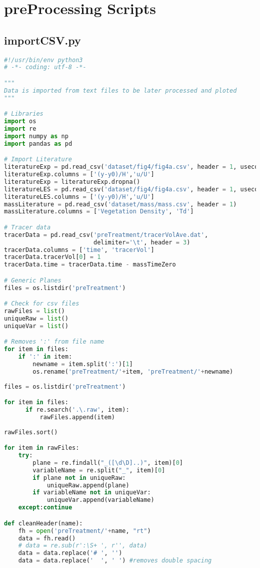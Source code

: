 \documentclass[../main.tex]{subfiles}
\begin{document}
\section{preProcessing Scripts}
\subsection{importCSV.py}
\begin{lstlisting}[language=python]
#!/usr/bin/env python3
# -*- coding: utf-8 -*-

"""
Data is imported from text files to be later processed and ploted
"""

# Libraries
import os
import re
import numpy as np
import pandas as pd

# Import Literature
literatureExp = pd.read_csv('dataset/fig4/fig4a.csv', header = 1, usecols=(0,1))
literatureExp.columns = ['(y-y0)/H','u/U']
literatureExp = literatureExp.dropna()
literatureLES = pd.read_csv('dataset/fig4/fig4a.csv', header = 1, usecols=(2,3))
literatureLES.columns = ['(y-y0)/H','u/U']
massLiterature = pd.read_csv('dataset/mass/mass.csv', header = 1)
massLiterature.columns = ['Vegetation Density', 'Td']

# Tracer data
tracerData = pd.read_csv('preTreatment/tracerVolAve.dat',
                         delimiter='\t', header = 3)
tracerData.columns = ['time', 'tracerVol']
tracerData.tracerVol[0] = 1
tracerData.time = tracerData.time - massTimeZero

# Generic Planes
files = os.listdir('preTreatment')

# Check for csv files
rawFiles = list()
uniqueRaw = list()
uniqueVar = list()

# Removes ':' from file name
for item in files:
    if ':' in item:    
        newname = item.split(':')[1]
        os.rename('preTreatment/'+item, 'preTreatment/'+newname)
        
files = os.listdir('preTreatment')

for item in files:
      if re.search('.\.raw', item):
          rawFiles.append(item)
          
rawFiles.sort()

for item in rawFiles:
    try:
        plane = re.findall("_([\d\D]..)", item)[0]
        variableName = re.split("_", item)[0]
        if plane not in uniqueRaw:
            uniqueRaw.append(plane)
        if variableName not in uniqueVar:
            uniqueVar.append(variableName)
    except:continue

def cleanHeader(name):
    fh = open('preTreatment/'+name, "rt")
    data = fh.read()
    # data = re.sub(r':\S+ ', r'', data)
    data = data.replace('# ', '')
    data = data.replace('  ', ' ') #removes double spacing
    

\end{lstlisting}
\end{document}
